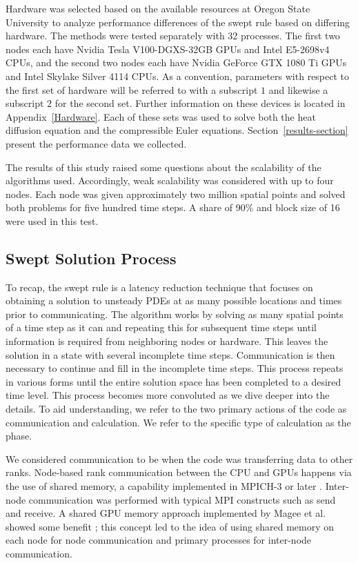 \documentclass[preprints,article,accept,moreauthors,pdftex]{Definitions/mdpi}
\def\oldCPU{Intel Skylake Silver 4114} %
\def\oldGPU{Nvidia GeForce GTX 1080 Ti}
\def\newCPU{Intel E5-2698v4} %
\def\newGPU{Nvidia Tesla V100-DGXS-32GB}
\begin{document}
\par
Hardware was selected based on the available resources at Oregon State University to analyze performance differences of the swept rule based on differing hardware. The methods were tested separately with 32 processes. The first two nodes each have \newGPU{} GPUs and \newCPU{} CPUs, and the second two nodes each have \oldGPU{} GPUs and \oldCPU{} CPUs. As a convention, parameters with respect to the first set of hardware will be referred to with a subscript $1$ and likewise a subscript $2$ for the second set. Further information on these devices is located in Appendix~\ref{Hardware}. Each of these sets was used to solve both the heat diffusion equation and the compressible Euler equations. Section~\ref{results-section} present the performance data we collected. 

\par 
The results of this study raised some questions about the scalability of the algorithms used. Accordingly, weak scalability was considered with up to four nodes. Each node was given approximately two million spatial points and solved both problems for five hundred time steps. A share of 90\% and block size of 16 were used in this test. 

\subsection{Swept Solution Process}
\label{swept-process-section}
To recap, the swept rule is a latency reduction technique that focuses on obtaining a solution to unsteady PDEs at as many possible locations and times prior to communicating. The algorithm works by solving as many spatial points of a time step as it can and repeating this for subsequent time steps until information is required from neighboring nodes or hardware. This leaves the solution in a state with several incomplete time steps. Communication is then necessary to continue and fill in the incomplete time steps. This process repeats in various forms until the entire solution space has been completed to a desired time level. This process becomes more convoluted as we dive deeper into the details. To aid understanding, we refer to the two primary actions of the code as communication and calculation. We refer to the specific type of calculation as the phase. 

\par
 We considered communication to be when the code was transferring data to other ranks. Node-based rank communication between the CPU and GPUs happens via the use of shared memory, a capability implemented in MPICH-3 or later \cite{Hoefler2013MPIMemory}. Inter-node communication was performed with typical MPI constructs such as send and receive. A shared GPU memory approach implemented by Magee et al. showed some benefit \cite{Magee2018AcceleratingDecomposition}; this concept led to the idea of using shared memory on each node for node communication and primary processes for inter-node communication.
 
\end{document}
